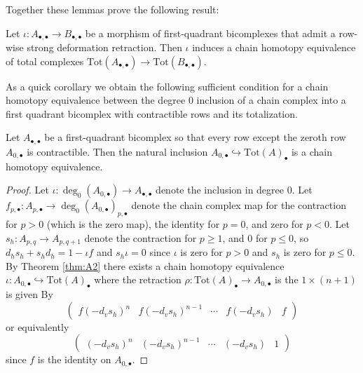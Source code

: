 Together these lemmas prove the following result:

\begin{thm}[label=thm:A2]
    Let $\iota:A_{\bullet,\bullet}\to B_{\bullet,\bullet}$ be a morphism of first-quadrant bicomplexes that admit a row-wise strong deformation retraction. Then $\iota$ induces a chain homotopy equivalence of total complexes $\text{Tot}(A_{\bullet,\bullet})\to \text{Tot}(B_{\bullet,\bullet})$.  
\end{thm}

As a quick corollary we obtain the following sufficient condition for a chain homotopy equivalence between the degree $0$ inclusion of a chain complex into a first quadrant bicomplex with contractible rows and its totalization.

\begin{cor}[label=cor:A7]
    Let $A_{\bullet,\bullet}$ be a first-quadrant bicomplex so that every row except the zeroth row $A_{0,\bullet}$ is contractible. Then the natural inclusion $A_{0,\bullet}\hookrightarrow \text{Tot}(A)_\bullet$ is a chain homotopy equivalence.
\end{cor}
\begin{proof}
    Let $\iota:\deg_0(A_{0,\bullet})\to A_{\bullet,\bullet}$ denote the inclusion in degree $0$. Let $f_{p,\bullet}:A_{p,\bullet} \to \deg_0(A_{0,\bullet})_{p,\bullet}$ denote the chain complex map for the contraction for $p > 0$ (which is the zero map), the identity for $p = 0$, and zero for $p < 0$. Let $s_h:A_{p,q} \to A_{p,q+1}$ denote the contraction for $p \geq 1$, and $0$ for $p \leq 0$, so $d_hs_h+s_hd_h = 1-\iota f$ and $s_h\iota = 0$ since $\iota$ is zero for $p > 0$ and $s_h$ is zero for $p \leq 0$. By Theorem \ref{thm:A2} there exists a chain homotopy equivalence $\iota:A_{0,\bullet}\hookrightarrow \text{Tot}(A)_\bullet$ where the retraction $\rho:\text{Tot}(A)_\bullet\to A_{0,\bullet}$ is the $1\times (n+1)$ is given By
    \begin{equation*}
        \begin{pmatrix}
            f(-d_vs_h)^n & f(-d_vs_h)^{n-1} & \cdots & f(-d_vs_h) & f
        \end{pmatrix}
    \end{equation*}
    or equivalently
    \begin{equation*}
        \begin{pmatrix}
            (-d_vs_h)^n & (-d_vs_h)^{n-1} & \cdots & (-d_vs_h) & 1
        \end{pmatrix}
    \end{equation*}
    since $f$ is the identity on $A_{0,\bullet}$.
\end{proof}